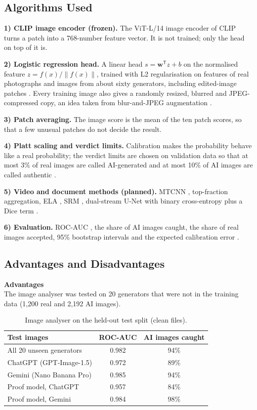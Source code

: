 \documentclass[12pt,a4paper]{article}
\begin{document}
\subsection{Algorithms Used}
\textbf{1) CLIP image encoder (frozen).} The ViT-L/14 image encoder of CLIP \cite{radford} turns a patch into a 768-number feature vector. It is not trained; only the head on top of it is.

\textbf{2) Logistic regression head.} A linear head $s=\mathbf{w}^{\mathsf T}z+b$ on the normalised feature $z=f(x)/\lVert f(x)\rVert$, trained with L2 regularisation on features of real photographs and images from about sixty generators, including edited-image patches \cite{diffseg}. Every training image also gives a randomly resized, blurred and JPEG-compressed copy, an idea taken from blur-and-JPEG augmentation \cite{wang}.

\textbf{3) Patch averaging.} The image score is the mean of the ten patch scores, so that a few unusual patches do not decide the result.

\textbf{4) Platt scaling and verdict limits.} Calibration \cite{guo,platt} makes the probability behave like a real probability; the verdict limits are chosen on validation data so that at most 3\% of real images are called AI-generated and at most 10\% of AI images are called authentic \cite{geifman}.

\textbf{5) Video and document methods (planned).} MTCNN \cite{mtcnn}, top-fraction aggregation, ELA \cite{krawetz}, SRM \cite{fridrich}, dual-stream U-Net \cite{unet} with binary cross-entropy plus a Dice term \cite{vnet}.

\textbf{6) Evaluation.} ROC-AUC \cite{fawcett}, the share of AI images caught, the share of real images accepted, 95\% bootstrap intervals \cite{efron} and the expected calibration error \cite{naeini}.

\subsection{Advantages and Disadvantages}
\textbf{Advantages}\\
The image analyser was tested on 20 generators that were not in the training data (1,200 real and 2,192 AI images).

\begin{table}[htbp]
\centering\small
\caption{Image analyser on the held-out test split (clean files).}
\begin{tabular}{lcc}
\toprule
Test images & ROC-AUC & AI images caught\\
\midrule
All 20 unseen generators & 0.982 & 94\%\\
ChatGPT (GPT-Image-1.5) & 0.972 & 89\%\\
Gemini (Nano Banana Pro) & 0.985 & 94\%\\
Proof model, ChatGPT & 0.957 & 84\%\\
Proof model, Gemini & 0.984 & 98\%\\
\bottomrule
\end{tabular}
\end{table}
\end{document}
